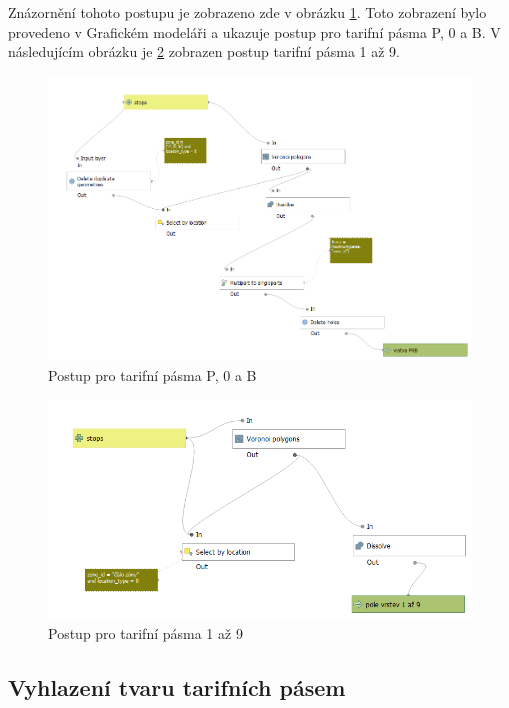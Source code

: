 Znázornění tohoto postupu je zobrazeno zde v obrázku \ref{fig:postup-voronoi-P0B}. Toto zobrazení bylo provedeno v Grafickém modeláři
a ukazuje postup pro tarifní pásma P, 0 a B. V následujícím obrázku je \ref{fig:postup-voronoi-1az9} zobrazen postup tarifní pásma 1 až 9.

\begin{figure}[H] \centering
    \includegraphics[width=400pt]{./pictures/postup-voronoi-P0B.png}
    \caption[Postup pro tarifní pásma P, 0 a B]{Postup pro tarifní pásma P, 0 a B}
	\label{fig:postup-voronoi-P0B}              
\end{figure}

\begin{figure}[H] \centering
    \includegraphics[width=400pt]{./pictures/postup-voronoi-1az9.png}
    \caption[Postup pro tarifní pásma 1 až 9]{Postup pro tarifní pásma 1 až 9}
	\label{fig:postup-voronoi-1az9}              
\end{figure}

\subsection{Vyhlazení tvaru tarifních pásem}

